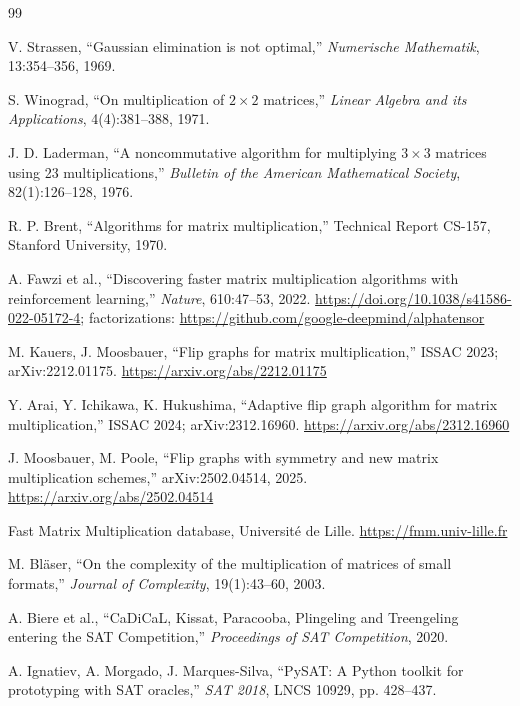 \documentclass[11pt]{article}
\begin{document}

\begin{thebibliography}{99}

V. Strassen, ``Gaussian elimination is not optimal,'' \emph{Numerische Mathematik}, 13:354--356, 1969.

S. Winograd, ``On multiplication of $2\times2$ matrices,'' \emph{Linear Algebra and its Applications},
4(4):381--388, 1971.

J. D. Laderman, ``A noncommutative algorithm for multiplying $3\times3$ matrices using 23
multiplications,'' \emph{Bulletin of the American Mathematical Society}, 82(1):126--128, 1976.

R. P. Brent, ``Algorithms for matrix multiplication,'' Technical Report CS-157, Stanford University,
1970.

A. Fawzi et al., ``Discovering faster matrix multiplication algorithms with reinforcement learning,''
\emph{Nature}, 610:47--53, 2022. \url{https://doi.org/10.1038/s41586-022-05172-4}; factorizations:
\url{https://github.com/google-deepmind/alphatensor}

M. Kauers, J. Moosbauer, ``Flip graphs for matrix multiplication,'' ISSAC 2023; arXiv:2212.01175.
\url{https://arxiv.org/abs/2212.01175}

Y. Arai, Y. Ichikawa, K. Hukushima, ``Adaptive flip graph algorithm for matrix multiplication,'' ISSAC
2024; arXiv:2312.16960. \url{https://arxiv.org/abs/2312.16960}

J. Moosbauer, M. Poole, ``Flip graphs with symmetry and new matrix multiplication schemes,''
arXiv:2502.04514, 2025. \url{https://arxiv.org/abs/2502.04514}

Fast Matrix Multiplication database, Universit\'e de Lille. \url{https://fmm.univ-lille.fr}

M. Bl\"aser, ``On the complexity of the multiplication of matrices of small formats,'' \emph{Journal of
Complexity}, 19(1):43--60, 2003.

A. Biere et al., ``CaDiCaL, Kissat, Paracooba, Plingeling and Treengeling entering the SAT Competition,''
\emph{Proceedings of SAT Competition}, 2020.

A. Ignatiev, A. Morgado, J. Marques-Silva, ``PySAT: A Python toolkit for prototyping with SAT oracles,''
\emph{SAT 2018}, LNCS 10929, pp. 428--437.

\end{thebibliography}
\end{document}
